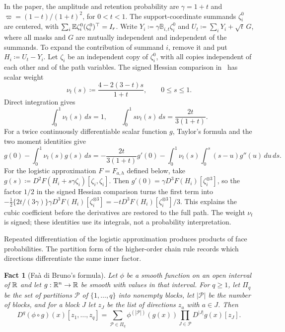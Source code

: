 \documentclass[11pt,letterpaper]{article}
\theoremstyle{plain}
\newtheorem{fact}{Fact}[section]
\begin{document}
In the paper, the amplitude and retention probability are
\(\gamma=1+t\) and \(\varpi=(1-t)/(1+t)^2\), for \(0<t<1\).
The support-coordinate summands \(\zeta_i^0\) are centered, with
\(\sum_i\mathbb E\zeta_i^0(\zeta_i^0)^\top=I_r\). Write
\(Y_i\coloneqq\gamma\mathbb B_{i,t}\zeta_i^0\) and
\(U_t\coloneqq\sum_iY_i+\sqrt t\,G\), where all masks and \(G\)
are mutually independent and independent of the summands. To expand the
contribution of summand \(i\), remove it and put \(H_i\coloneqq U_t-Y_i\).
Let \(\zeta_i\) be an independent copy of \(\zeta_i^0\), with all copies
independent of each other and of the path variables. The signed Hessian
comparison in~ has scalar weight
\[
 \nu_t(s)\coloneqq \frac{4-2(3-t)s}{1+t},\qquad 0\le s\le1.
\]
Direct integration gives
\[
 \int_0^1\nu_t(s)\,ds=1,\qquad
 \int_0^1s\nu_t(s)\,ds=\frac{2t}{3(1+t)}.
\]
For a twice continuously differentiable scalar function \(g\),
Taylor's formula and the two moment identities give
\[
 g(0)-\int_0^1\nu_t(s)g(s)\,ds
 =-\frac{2t}{3(1+t)}g'(0)
   -\int_0^1\nu_t(s)\int_0^s(s-u)g''(u)\,du\,ds.
\]
For the logistic approximation \(F=F_{a,h}\) defined below, take
\(g(s)\coloneqq D^2F(H_i+s\gamma\zeta_i)[\zeta_i,\zeta_i]\).
Then \(g'(0)=\gamma D^3F(H_i)[\zeta_i^{\otimes3}]\), so
the factor \(1/2\) in the signed Hessian comparison turns the first
term into
\(-\tfrac12\{2t/(3\gamma)\}\gamma
 D^3F(H_i)[\zeta_i^{\otimes3}]
 =-tD^3F(H_i)[\zeta_i^{\otimes3}]/3\). This explains the
cubic coefficient before the derivatives are restored to the full path.
The weight \(\nu_t\) is signed; these identities use its
integrals, not a probability interpretation.

Repeated differentiation of the logistic approximation produces products
of face probabilities. The partition form of the higher-order chain
rule records which directions differentiate the same inner factor.

\begin{fact}[Fa\`a di Bruno's formula]\label{tb:faa}
Let \(\phi\) be a smooth function on an open interval of \(\mathbb R\) and let
\(g:\mathbb R^n\to\mathbb R\) be smooth with values in that interval. For \(q\ge1\), let
\(\Pi_q\) be the set of partitions \(\mathcal P\) of \(\{1,\ldots,q\}\) into
nonempty blocks, let \(|\mathcal P|\) be the number of blocks, and for a
block \(J\) let \(z_J\) be the list of directions \(z_a\) with
\(a\in J\). Then
\[
 D^q(\phi\circ g)(x)[z_1,\ldots,z_q]
 =\sum_{\mathcal P\in\Pi_q}\phi^{(|\mathcal P|)}(g(x))
  \prod_{J\in\mathcal P}D^{|J|}g(x)[z_J].
\]
\end{fact}
\end{document}
